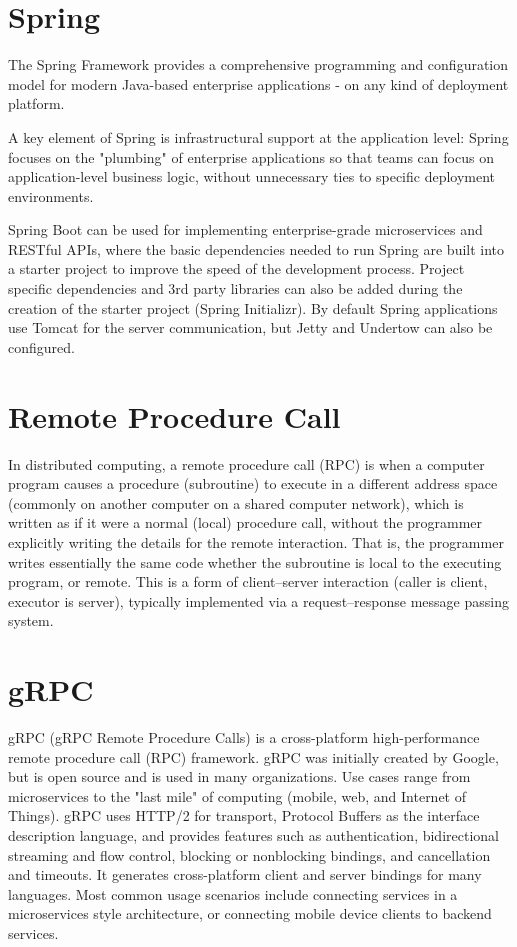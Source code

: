 \section{Spring}
	The Spring Framework \cite{springframework} provides a comprehensive programming and configuration model for modern Java-based enterprise applications - on any kind
	 of deployment platform.

	A key element of Spring is infrastructural support at the application level: Spring focuses on the 
	"plumbing" of enterprise applications so that teams can focus on application-level business logic, 
	without unnecessary ties to specific deployment environments.

	Spring Boot \cite{springboot} can be used for implementing enterprise-grade microservices and RESTful APIs, where the basic dependencies needed to run Spring
	are built into a starter project
	to improve the speed of the development process. Project specific dependencies and 3rd party libraries 
	can also be added during the creation of the starter project (Spring Initializr).
	By default Spring applications use Tomcat for the server communication, but Jetty and Undertow can also be configured.


\section{Remote Procedure Call}
	In distributed computing, a remote procedure call (RPC) \cite{rpc} is when a computer program causes a procedure (subroutine) to execute in a different address space 
	(commonly on another computer on a shared computer network), which is written as if it were a normal (local) procedure call, without the programmer 
	explicitly writing the details for the remote interaction. That is, the programmer writes essentially the same code whether the subroutine is local to 
	the executing program, or remote.
	This is a form of client–server interaction (caller is client, executor is server), typically implemented via a request–response message passing system.

\section{gRPC}
	gRPC (gRPC Remote Procedure Calls) \cite{grpcwiki} is a cross-platform high-performance remote procedure call (RPC) framework. 
	gRPC was initially created by Google, but is open source and is used in many organizations. 
	Use cases range from microservices to the "last mile" of computing (mobile, web, and Internet of Things). 
	gRPC uses HTTP/2 for transport, Protocol Buffers as the interface description language, and provides features such as authentication,
	bidirectional streaming and flow control, blocking or nonblocking bindings, and cancellation and timeouts. 
	It generates cross-platform client and server bindings for many languages. Most common usage scenarios include connecting services in a microservices 
	style architecture, or connecting mobile device clients to backend services.

